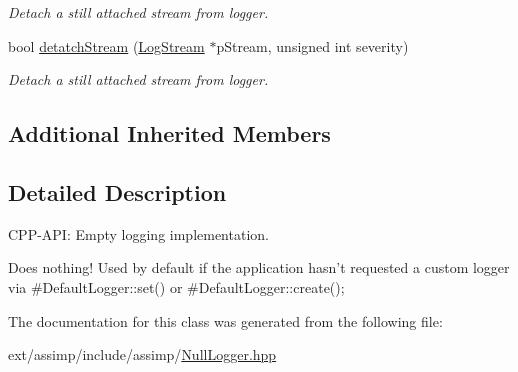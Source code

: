 \begin{DoxyCompactItemize}
\begin{DoxyCompactList}\small\item\em Detach a still attached stream from logger. \end{DoxyCompactList}\item 
\hypertarget{class_assimp_1_1_null_logger_ab49b14a0045aab73b813a448b5aa77b4}{bool \hyperlink{class_assimp_1_1_null_logger_ab49b14a0045aab73b813a448b5aa77b4}{detatch\-Stream} (\hyperlink{class_assimp_1_1_log_stream}{Log\-Stream} $\ast$p\-Stream, unsigned int severity)}\label{class_assimp_1_1_null_logger_ab49b14a0045aab73b813a448b5aa77b4}

\begin{DoxyCompactList}\small\item\em Detach a still attached stream from logger. \end{DoxyCompactList}\end{DoxyCompactItemize}
\subsection*{Additional Inherited Members}


\subsection{Detailed Description}
C\-P\-P-\/\-A\-P\-I\-: Empty logging implementation. 

Does nothing! Used by default if the application hasn't requested a custom logger via \#\-Default\-Logger\-::set() or \#\-Default\-Logger\-::create(); 

The documentation for this class was generated from the following file\-:\begin{DoxyCompactItemize}
\item 
ext/assimp/include/assimp/\hyperlink{_null_logger_8hpp}{Null\-Logger.\-hpp}\end{DoxyCompactItemize}
